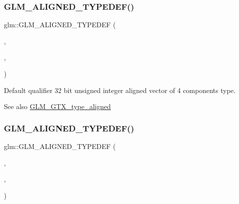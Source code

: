 \subsubsection{\texorpdfstring{G\+L\+M\+\_\+\+A\+L\+I\+G\+N\+E\+D\+\_\+\+T\+Y\+P\+E\+D\+E\+F()}{GLM\_ALIGNED\_TYPEDEF()}\hspace{0.1cm}{\footnotesize\ttfamily [132/209]}}
{\footnotesize\ttfamily glm\+::\+G\+L\+M\+\_\+\+A\+L\+I\+G\+N\+E\+D\+\_\+\+T\+Y\+P\+E\+D\+EF (\begin{DoxyParamCaption}\item[{\mbox{\hyperlink{group__gtc__type__precision_gad3f72b91c5b7efbc377625c44433824d}{u32vec4}}}]{,  }\item[{aligned\+\_\+u32vec4}]{,  }\item[{16}]{ }\end{DoxyParamCaption})}

Default qualifier 32 bit unsigned integer aligned vector of 4 components type. \begin{DoxySeeAlso}{See also}
\mbox{\hyperlink{group__gtx__type__aligned}{G\+L\+M\+\_\+\+G\+T\+X\+\_\+type\+\_\+aligned}} 
\end{DoxySeeAlso}
\mbox{\label{group__gtx__type__aligned_gab253845f534a67136f9619843cade903}} 
\subsubsection{\texorpdfstring{G\+L\+M\+\_\+\+A\+L\+I\+G\+N\+E\+D\+\_\+\+T\+Y\+P\+E\+D\+E\+F()}{GLM\_ALIGNED\_TYPEDEF()}\hspace{0.1cm}{\footnotesize\ttfamily [133/209]}}
{\footnotesize\ttfamily glm\+::\+G\+L\+M\+\_\+\+A\+L\+I\+G\+N\+E\+D\+\_\+\+T\+Y\+P\+E\+D\+EF (\begin{DoxyParamCaption}\item[{\mbox{\hyperlink{group__gtc__type__precision_gaf01aa7972f78cabc61558a0171d78a01}{u64vec1}}}]{,  }\item[{aligned\+\_\+u64vec1}]{,  }\item[{8}]{ }\end{DoxyParamCaption})}

